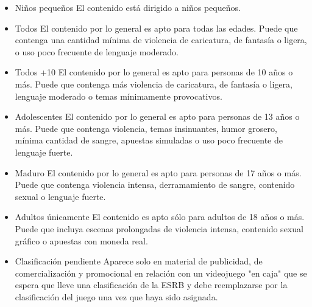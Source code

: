 			\begin{itemize}
			\item Niños pequeños
			El contenido está dirigido a niños pequeños.
			
			\item Todos
			El contenido por lo general es apto para todas las edades. Puede que contenga una cantidad mínima de violencia de caricatura, de fantasía o ligera, o uso poco frecuente de lenguaje moderado.
			
			\item Todos +10
			El contenido por lo general es apto para personas de 10 años o más. Puede que contenga más violencia de caricatura, de fantasía o ligera, lenguaje moderado o temas mínimamente provocativos.
			
			\item Adolescentes
			El contenido por lo general es apto para personas de 13 años o más. Puede que contenga violencia, temas insinuantes, humor grosero, mínima cantidad de sangre, apuestas simuladas o uso poco frecuente de lenguaje fuerte.
			
			\item Maduro
			El contenido por lo general es apto para personas de 17 años o más. Puede que contenga violencia intensa, derramamiento de sangre, contenido sexual o lenguaje fuerte.
			
			\item Adultos únicamente
			El contenido es apto sólo para adultos de 18 años o más. Puede que incluya escenas prolongadas de violencia intensa, contenido sexual gráfico o apuestas con moneda real.
			
			\item Clasificación pendiente
			Aparece solo en material de publicidad, de comercialización y promocional en relación con un videojuego "en caja" que se espera que lleve una clasificación de la ESRB y debe reemplazarse por la clasificación del juego una vez que haya sido asignada.
			
		\end{itemize}		
			
